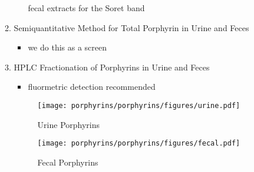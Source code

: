 \documentclass{scrartcl}
\begin{document}
\begin{enumerate}
\begin{enumerate}
\begin{itemize}
fecal extracts for the Soret band
\end{itemize}
\item Semiquantitative Method for Total Porphyrin in Urine and Feces
\label{sec:org4fbaa14}
\begin{itemize}
\item we do this as a screen
\end{itemize}
\item HPLC Fractionation of Porphyrins in Urine and Feces
\label{sec:org21107f5}
\begin{itemize}
\item fluormetric detection recommended
\end{itemize}

\begin{figure}[htbp]
\centering
\texttt{[image: porphyrins/porphyrins/figures/urine.pdf]}
\caption{\label{fig:orga0be55e}Urine Porphyrins}
\end{figure}

\begin{figure}[htbp]
\centering
\texttt{[image: porphyrins/porphyrins/figures/fecal.pdf]}
\caption{\label{fig:org672b14e}Fecal Porphyrins}
\end{figure}
\end{enumerate}


\end{enumerate}
\end{document}
